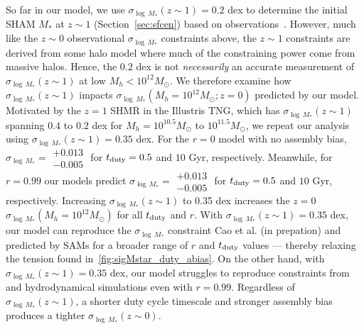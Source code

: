 \documentclass[12pt, letterpaper, preprint, tighten]{aastex62}
\newcommand{\ch}[1]{\color{orange}{\bf CH:} #1}
\begin{document}
So far in our model, we use $\sigma_{\log\,M_*}(z\sim1) = 0.2$ dex to determine 
the initial SHAM $M_*$ at $z\sim1$ (Section~\ref{sec:sfcen})  based on observations~\citep[\emph{e.g.}][]{leauthaud2012, tinker2013, patel2015}.
However, much like the $z\sim0$ observational $\sigma_{\log\,M_*}$ constraints 
above, the $z\sim1$ constraints are derived from some halo model where much of 
the constraining power come from massive halos. Hence, the $0.2$ dex is not 
{\em necessarily} an accurate measurement of $\sigma_{\log\,M_*}(z\sim1)$ at low 
$M_h < 10^{12}M_\odot$. We therefore examine how $\sigma_{\log\,M_*}(z\sim1)$ impacts 
$\sigma_{\log\,M_*}(M_h=10^{12}M_\odot; z=0)$ predicted by our model. Motivated by 
the $z=1$ SHMR in the Illustris TNG, which has $\sigma_{\log\,M_*}(z\sim1)$ spanning 
$0.4$ to $0.2$ dex for $M_h = 10^{10.5}M_\odot$ to $10^{11.5}M_\odot$, we repeat our 
analysis using $\sigma_{\log\,M_*}(z\sim1) = 0.35$ dex. 
{\ch For the $r=0$ model with no 
assembly bias, $\sigma_{\log\,M_*} = \substack{+0.013\\-0.005}$ for $t_{\rm duty} = 0.5$ and $10$ Gyr, respectively. 
Meanwhile, for $r = 0.99$ our models predict $\sigma_{\log\,M_*} =\substack{+0.013\\-0.005} $ for 
$t_{\rm duty} = 0.5$ and $10$ Gyr, respectively.} 
Increasing $\sigma_{\log\,M_*}(z\sim1)$ to 0.35 dex increases the $z=0$ 
$\sigma_{\log\,M_*}(M_h=10^{12}M_\odot)$ for all $t_{\rm duty}$ and $r$. With 
$\sigma_{\log\,M_*}(z\sim1) = 0.35$ dex, our model can reproduce the 
$\sigma_{\log\,M_*}$ constraint Cao et al. (in prepation) and predicted by SAMs 
for a broader range of $r$ and $t_{\rm duty}$ values --- thereby relaxing the tension 
found in~\ref{fig:sigMstar_duty_abias}. On the other hand, with $\sigma_{\log\,M_*}(z\sim1) = 0.35$ dex, 
our model struggles to reproduce constraints from~\cite{more2011, leauthaud2012, reddick2013, tinker2013, zu2015} 
and hydrodynamical simulations even with $r=0.99$. Regardless of $\sigma_{\log\,M_*}(z\sim1)$, 
a shorter duty cycle timescale and stronger assembly bias produces a tighter 
$\sigma_{\log\,M_*}(z\sim0)$. 
\end{document}
